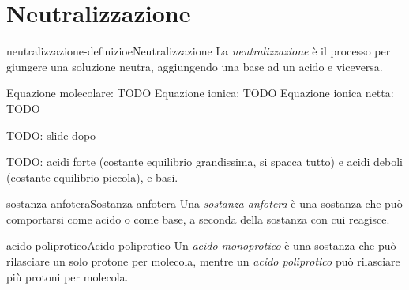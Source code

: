 \documentclass[preview]{standalone}
\begin{document}
\section{Neutralizzazione}

\begin{snippetdefinition}{neutralizzazione-definizioe}{Neutralizzazione}
    La \textit{neutralizzazione} è il processo per giungere una soluzione
    neutra, aggiungendo una base ad un acido e viceversa.
\end{snippetdefinition}


Equazione molecolare: TODO
Equazione ionica: TODO
Equazione ionica netta: TODO

TODO: slide dopo

TODO: acidi forte (costante equilibrio grandissima, si spacca tutto)
e acidi deboli (costante equilibrio piccola), e basi.

%
%
%
%
%
%

\begin{snippetdefinition}{sostanza-anfotera}{Sostanza anfotera}
    Una \textit{sostanza anfotera} è una sostanza che
    può comportarsi come acido o come base, a seconda della sostanza con cui reagisce.
\end{snippetdefinition}



\begin{snippetdefinition}{acido-poliprotico}{Acido poliprotico}
    Un \textit{acido monoprotico} è una sostanza che può rilasciare
    un solo protone per molecola, mentre un \textit{acido poliprotico}
    può rilasciare più protoni per molecola.
\end{snippetdefinition}
\end{document}
